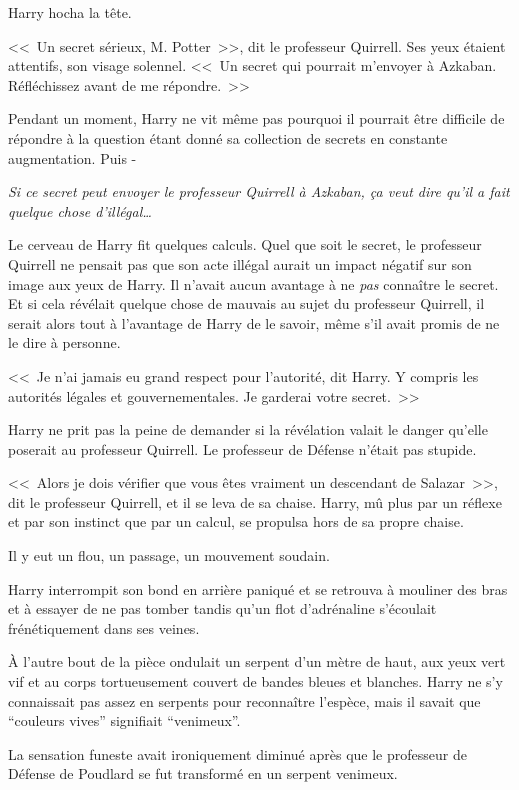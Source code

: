 Harry hocha la tête.

<<~Un secret sérieux, M. Potter~>>, dit le professeur Quirrell. Ses yeux étaient attentifs, son visage solennel. <<~Un secret qui pourrait m'envoyer à Azkaban. Réfléchissez avant de me répondre.~>>

Pendant un moment, Harry ne vit même pas pourquoi il pourrait être difficile de répondre à la question étant donné sa collection de secrets en constante augmentation. Puis -

\emph{Si ce secret peut envoyer le professeur Quirrell à Azkaban, ça veut dire qu'il a fait quelque chose d'illégal…}

Le cerveau de Harry fit quelques calculs. Quel que soit le secret, le professeur Quirrell ne pensait pas que son acte illégal aurait un impact négatif sur son image aux yeux de Harry. Il n'avait aucun avantage à ne \emph{pas} connaître le secret. Et si cela révélait quelque chose de mauvais au sujet du professeur Quirrell, il serait alors tout à l'avantage de Harry de le savoir, même s'il avait promis de ne le dire à personne.

<<~Je n'ai jamais eu grand respect pour l'autorité, dit Harry. Y compris les autorités légales et gouvernementales. Je garderai votre secret.~>>

Harry ne prit pas la peine de demander si la révélation valait le danger qu'elle poserait au professeur Quirrell. Le professeur de Défense n'était pas stupide.

<<~Alors je dois vérifier que vous êtes vraiment un descendant de Salazar~>>, dit le professeur Quirrell, et il se leva de sa chaise. Harry, mû plus par un réflexe et par son instinct que par un calcul, se propulsa hors de sa propre chaise.

Il y eut un flou, un passage, un mouvement soudain.

Harry interrompit son bond en arrière paniqué et se retrouva à mouliner des bras et à essayer de ne pas tomber tandis qu'un flot d'adrénaline s'écoulait frénétiquement dans ses veines.

À l'autre bout de la pièce ondulait un serpent d'un mètre de haut, aux yeux vert vif et au corps tortueusement couvert de bandes bleues et blanches. Harry ne s'y connaissait pas assez en serpents pour reconnaître l'espèce, mais il savait que “couleurs vives” signifiait “venimeux”.

La sensation funeste avait ironiquement diminué après que le professeur de Défense de Poudlard se fut transformé en un serpent venimeux.

